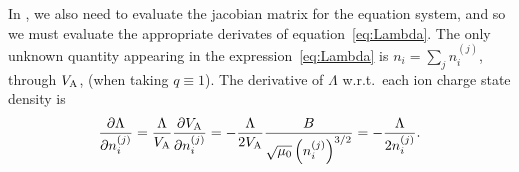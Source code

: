 \documentclass{notes}
\begin{document}
	In \DREAM, we also need to evaluate the jacobian matrix for the equation
	system, and so we must evaluate the appropriate derivates of
	equation~\eqref{eq:Lambda}. The only unknown quantity appearing in the
	expression~\eqref{eq:Lambda} is $n_i=\sum_jn_i^{(j)}$, through $V_{\rm A}$,
	(when taking $q\equiv 1$). The derivative of $\Lambda$ w.r.t.\ each ion
	charge state density is
	\begin{equation}
		\frac{\partial\Lambda}{\partial n_i^{(j)}} =
			\frac{\Lambda}{V_{\rm A}}\frac{\partial V_{\rm A}}{\partial n_i^{(j)}}
		=
		-\frac{\Lambda}{2V_{\rm A}}\frac{B}{\sqrt{\mu_0}\left(n_i^{(j)}\right)^{3/2}}
		=
		-\frac{\Lambda}{2n_i^{(j)}}.
	\end{equation}

	\printbibliography
\end{document}
